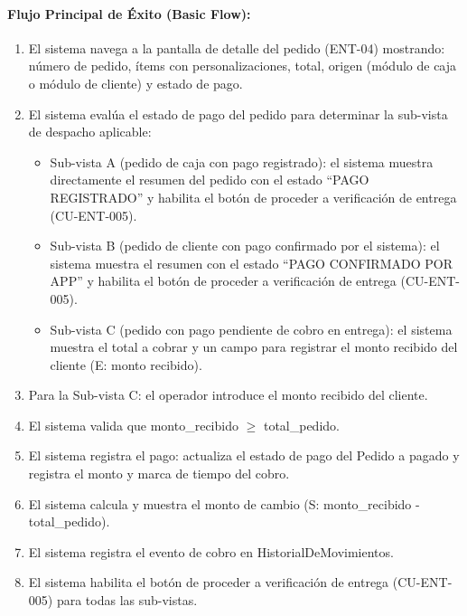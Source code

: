 \paragraph{Flujo Principal de Éxito (Basic Flow):}
\begin{enumerate}
    \item[I.] El sistema navega a la pantalla de detalle del pedido (ENT-04) mostrando: número de pedido, ítems con personalizaciones, total, origen (módulo de caja o módulo de cliente) y estado de pago.
    \item[II.] El sistema evalúa el estado de pago del pedido para determinar la sub-vista de despacho aplicable:
    \begin{itemize}
        \item Sub-vista A (pedido de caja con pago registrado): el sistema muestra directamente el resumen del pedido con el estado ``PAGO REGISTRADO'' y habilita el botón de proceder a verificación de entrega (CU-ENT-005).
        \item Sub-vista B (pedido de cliente con pago confirmado por el sistema): el sistema muestra el resumen con el estado ``PAGO CONFIRMADO POR APP'' y habilita el botón de proceder a verificación de entrega (CU-ENT-005).
        \item Sub-vista C (pedido con pago pendiente de cobro en entrega): el sistema muestra el total a cobrar y un campo para registrar el monto recibido del cliente (E: monto recibido).
    \end{itemize}
    \item[III.] Para la Sub-vista C: el operador introduce el monto recibido del cliente.
    \item[IV.] El sistema valida que monto\_recibido $\ge$ total\_pedido.
    \item[V.] El sistema registra el pago: actualiza el estado de pago del Pedido a pagado y registra el monto y marca de tiempo del cobro.
    \item[VI.] El sistema calcula y muestra el monto de cambio (S: monto\_recibido - total\_pedido).
    \item[VII.] El sistema registra el evento de cobro en HistorialDeMovimientos.
    \item[VIII.] El sistema habilita el botón de proceder a verificación de entrega (CU-ENT-005) para todas las sub-vistas.
\end{enumerate}

